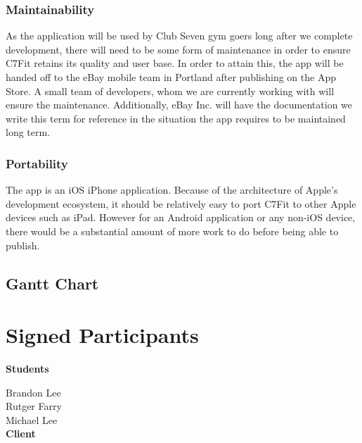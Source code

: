 \documentclass[letterpaper,10pt,titlepage]{article}
\begin{document}
\subsubsection{Maintainability}

As the application will be used by Club Seven gym goers long after we complete development, there will need to be some form of maintenance in order to ensure C7Fit retains its quality and user base. In order to attain this, the app will be handed off to the eBay mobile team in Portland after publishing on the App Store. A small team of developers, whom we are currently working with will ensure the maintenance. Additionally, eBay Inc. will have the documentation we write this term for reference in the situation the app requires to be maintained long term.

\subsubsection{Portability}

The app is an iOS iPhone application. Because of the architecture of Apple's development ecosystem, it should be relatively easy to port C7Fit to other Apple devices such as iPad. However for an Android application or any non-iOS device, there would be a substantial amount of more work to do before being able to publish.

\subsection{Gantt Chart}

\noindent{}

\newpage

\section{Signed Participants}

\textbf{Students}

Brandon Lee\\
Rutger Farry\\
Michael Lee\\

\textbf{Client}
\end{document}
